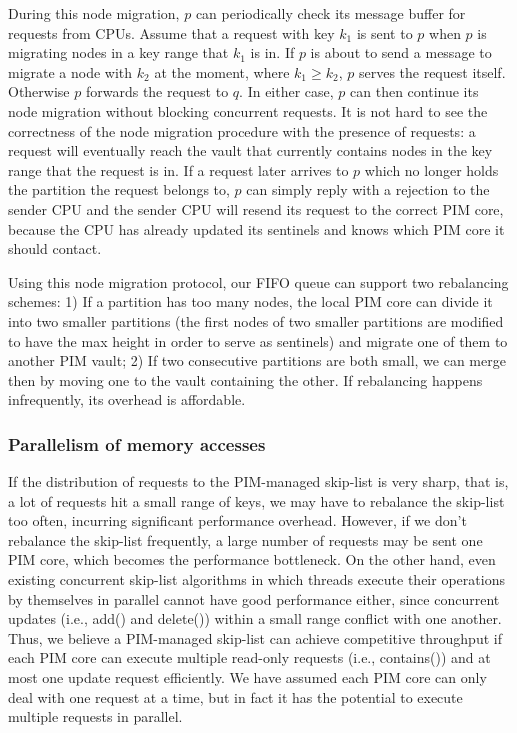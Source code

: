 \documentclass[11pt]{article}
\begin{document}
During this node migration, $p$ can periodically check its message buffer for requests from CPUs.
Assume that a request with key $k_1$ is sent to $p$ when $p$ is migrating nodes 
in a key range that $k_1$ is in.  
If $p$ is about to send a message to migrate a node with $k_2$ at the moment, where $k_1 \ge k_2$, 
$p$ serves the request itself. 
Otherwise $p$ forwards the request to $q$. 
In either case, $p$ can then continue its node migration without blocking concurrent requests. 
It is not hard to see the correctness of the node migration procedure 
with the presence of requests: a request will eventually reach the vault that 
currently contains nodes in the key range that the request is in.
If a request later arrives to $p$ which no longer holds the partition the request belongs to, 
$p$ can simply reply with a rejection to the sender CPU and 
the sender CPU will resend its request to the correct PIM core, 
because the CPU has already updated its sentinels and knows which PIM core it should contact. 

Using this node migration protocol, our FIFO queue can support two rebalancing schemes:
1) If a partition has too many nodes, the local PIM core can divide it into two smaller  
partitions (the first nodes of two smaller partitions are modified to have the max height 
in order to serve as sentinels) and migrate one of them to another PIM vault; 
2) If two consecutive partitions are both small, we can merge then by moving one to the vault 
containing the other. 
If rebalancing happens infrequently, its overhead is affordable. 

\subsubsection{Parallelism of memory accesses}
If the distribution of requests to the PIM-managed skip-list is very sharp, that is, 
a lot of requests hit a small range of keys, we may have to rebalance the skip-list too often, 
incurring significant performance overhead. 
However, if we don't rebalance the skip-list frequently, 
a large number of requests may be sent one PIM core, which becomes the performance bottleneck. 
On the other hand, even existing concurrent skip-list algorithms in which threads execute 
their operations by themselves in parallel cannot have good performance either, 
since concurrent updates (i.e., add() and delete()) within a small range conflict with one another. 
Thus, we believe a PIM-managed skip-list can achieve competitive throughput if each PIM core can 
execute multiple read-only requests (i.e., contains()) and at most one update request efficiently. 
We have assumed each PIM core can only deal with one request at a time, 
but in fact it has the potential to execute multiple requests in parallel.
\end{document}
